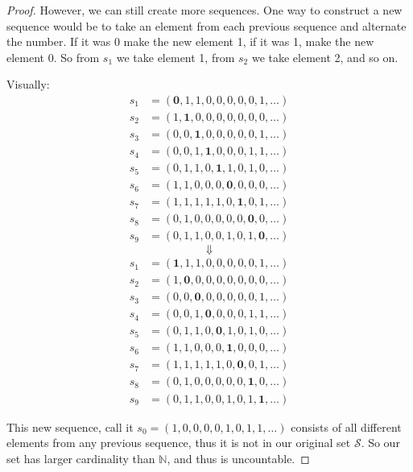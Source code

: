 \documentclass[12pt,letterpaper]{article}
\begin{document}
\begin{enumerate}
\begin{proof}
        However, we can still create more sequences.
        One way to construct a new sequence would be to take an element from each previous sequence and alternate the number.
        If it was 0 make the new element 1, if it was 1, make the new element 0.
        So from $s_1$ we take element 1, from $s_2$ we take element 2, and so on.

        Visually:
        \begin{align*}
          s_1 &= (\mathbf{0}, 1, 1, 0, 0, 0, 0, 0, 1, \dots) \\
          s_2 &= (1, \mathbf{1}, 0, 0, 0, 0, 0, 0, 0, \dots) \\
          s_3 &= (0, 0, \mathbf{1}, 0, 0, 0, 0, 0, 1, \dots) \\
          s_4 &= (0, 0, 1, \mathbf{1}, 0, 0, 0, 1, 1, \dots) \\
          s_5 &= (0, 1, 1, 0, \mathbf{1}, 1, 0, 1, 0, \dots) \\
          s_6 &= (1, 1, 0, 0, 0, \mathbf{0}, 0, 0, 0, \dots) \\
          s_7 &= (1, 1, 1, 1, 1, 0, \mathbf{1}, 0, 1, \dots) \\
          s_8 &= (0, 1, 0, 0, 0, 0, 0, \mathbf{0}, 0, \dots) \\
          s_9 &= (0, 1, 1, 0, 0, 1, 0, 1, \mathbf{0}, \dots)
        \end{align*}
        \[\Downarrow\]
        \begin{align*}
          s_1 &= (\mathbf{1}, 1, 1, 0, 0, 0, 0, 0, 1, \dots) \\
          s_2 &= (1, \mathbf{0}, 0, 0, 0, 0, 0, 0, 0, \dots) \\
          s_3 &= (0, 0, \mathbf{0}, 0, 0, 0, 0, 0, 1, \dots) \\
          s_4 &= (0, 0, 1, \mathbf{0}, 0, 0, 0, 1, 1, \dots) \\
          s_5 &= (0, 1, 1, 0, \mathbf{0}, 1, 0, 1, 0, \dots) \\
          s_6 &= (1, 1, 0, 0, 0, \mathbf{1}, 0, 0, 0, \dots) \\
          s_7 &= (1, 1, 1, 1, 1, 0, \mathbf{0}, 0, 1, \dots) \\
          s_8 &= (0, 1, 0, 0, 0, 0, 0, \mathbf{1}, 0, \dots) \\
          s_9 &= (0, 1, 1, 0, 0, 1, 0, 1, \mathbf{1}, \dots)
        \end{align*}

        This new sequence, call it $s_0 = (1, 0, 0, 0, 0, 1, 0, 1, 1, \dots)$ consists of all different elements from any previous sequence,
        thus it is not in our original set $\mathcal{S}$.
        So our set has larger cardinality than $\mathbb{N}$, and thus is uncountable.
      \end{proof}
  \end{enumerate}
\end{document}
